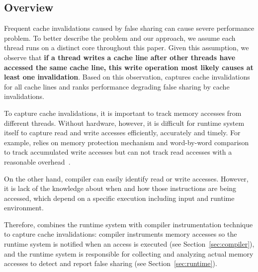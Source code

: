 \label{sec:detection}

\subsection{Overview}
\label{sec:overview}
Frequent cache invalidations caused by false sharing can cause severe performance problem.
To better describe the problem and our approach, we assume each thread runs on a distinct core throughout this paper. Given this assumption, we observe that 
\textbf{if a thread writes a cache line after other threads have 
accessed the same cache line, this write operation most likely causes at least
one invalidation}. 
Based on this observation, \Defaults{} captures cache invalidations for all cache lines and 
ranks performance degrading false sharing by cache invalidations.
 
To capture cache invalidations, it is important to track memory accesses from different 
threads. 
Without hardware, however, it is difficult for runtime system itself to capture read and write accesses efficiently, accurately and timely. 
For example, \Sheriff{} relies on memory protection mechanism and word-by-word
comparison to track accumulated write accesses but can not track read accesses with a 
reasonable overhead~\cite{sheriff}. 


On the other hand, compiler can easily identify  
read or write accesses. However,
it is lack of the knowledge about when and how those instructions are being accessed, 
which depend on a specific execution including input and runtime environment. 

Therefore,  combines the runtime system with compiler instrumentation technique to capture 
cache invalidations: compiler instruments memory accesses so the runtime
system is notified when an access is executed (see Section~\ref{sec:compiler}),
and the runtime system is responsible for collecting and analyzing actual memory accesses 
to detect and report false sharing (see Section~\ref{sec:runtime}).

